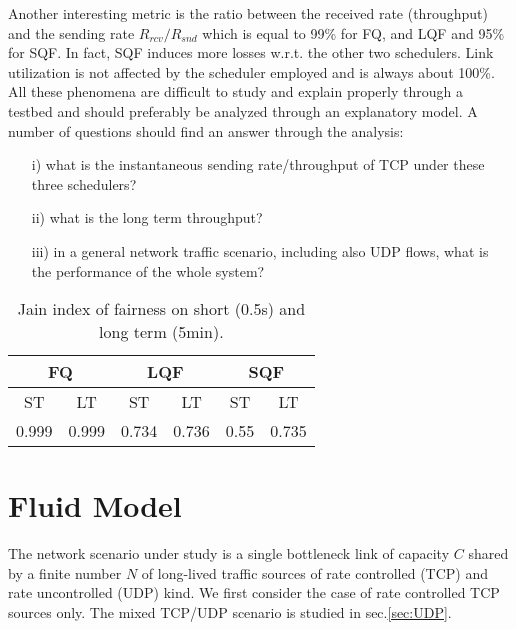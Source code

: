 \documentclass[a4paper,oneside, 11pt]{article}
\begin{document}
Another interesting metric is the ratio between the received rate (throughput) and
the sending rate $R_{rcv}/R_{snd}$ which is equal to 99\% for FQ,
and  LQF and 95\% for SQF. In fact, SQF induces more losses w.r.t. the other two schedulers.
Link utilization is not affected by the scheduler employed and is always about 100\%.
All these phenomena are difficult to study and explain properly through a testbed and should
preferably be analyzed through an explanatory model.
A number of questions should find an answer through the analysis:
\begin{itemize}
\item[i)] what is the instantaneous sending rate/throughput of TCP under these three schedulers?
\item[ii)] what is the long term throughput?
\item[iii)] in a general network traffic scenario, including also UDP flows, what
is the performance of the whole system?
\end{itemize}
\begin{table}
\centering
\begin{tabular}{|cc|cc|cc|}
\hline
 \multicolumn{2}{|c}{{FQ}} & \multicolumn{2}{|c}{{LQF}} &\multicolumn{2}{|c|}{{SQF}} \\
\hline
\hline
ST & LT  & ST  & LT & ST & LT \\
0.999 & 0.999 & 0.734  & 0.736 & 0.55 & 0.735 \\
\hline
\end{tabular}
\caption{Jain index of fairness on short (0.5s) and long term (5min).}
\label{tab:fairness}
\end{table}

\section{Fluid Model}\label{sec:model}
The network scenario under study is a single bottleneck link of capacity $C$ shared by a finite number $N$ of
long-lived traffic sources of rate controlled (TCP) and rate uncontrolled (UDP) kind.
We first consider the case of rate controlled TCP sources only. The mixed TCP/UDP scenario is studied
in sec.\ref{sec:UDP}.
\end{document}
